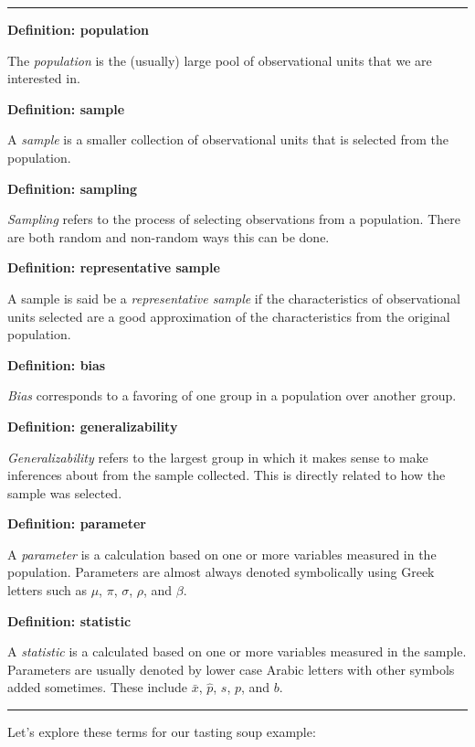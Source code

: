 \documentclass[]{tufte-book}
\let\oldrule=\rule
\renewcommand{\rule}[1]{\oldrule{\linewidth}}
\begin{document}
\begin{center}\rule{0.5\linewidth}{\linethickness}\end{center}

\textbf{Definition: population}

The \emph{population} is the (usually) large pool of observational units
that we are interested in.

\textbf{Definition: sample}

A \emph{sample} is a smaller collection of observational units that is
selected from the population.

\textbf{Definition: sampling}

\emph{Sampling} refers to the process of selecting observations from a
population. There are both random and non-random ways this can be done.

\textbf{Definition: representative sample}

A sample is said be a \emph{representative sample} if the
characteristics of observational units selected are a good approximation
of the characteristics from the original population.

\textbf{Definition: bias}

\emph{Bias} corresponds to a favoring of one group in a population over
another group.

\textbf{Definition: generalizability}

\emph{Generalizability} refers to the largest group in which it makes
sense to make inferences about from the sample collected. This is
directly related to how the sample was selected.

\textbf{Definition: parameter}

A \emph{parameter} is a calculation based on one or more variables
measured in the population. Parameters are almost always denoted
symbolically using Greek letters such as \(\mu\), \(\pi\), \(\sigma\),
\(\rho\), and \(\beta\).

\textbf{Definition: statistic}

A \emph{statistic} is a calculated based on one or more variables
measured in the sample. Parameters are usually denoted by lower case
Arabic letters with other symbols added sometimes. These include
\(\bar{x}\), \(\hat{p}\), \(s\), \(p\), and \(b\).

\begin{center}\rule{0.5\linewidth}{\linethickness}\end{center}

Let's explore these terms for our tasting soup example:
\end{document}
